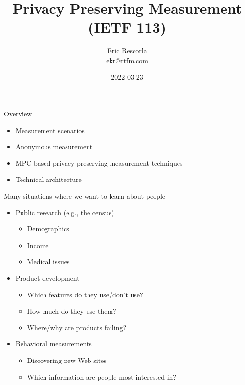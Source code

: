\documentclass[helvetica]{beamer}
\title{Privacy Preserving Measurement (IETF 113)}
\author{Eric Rescorla \\\url{ekr@rtfm.com}}
\date{2022-03-23}
\begin{document}
\begin{frame}
  \titlepage
\end{frame}

\begin{frame}{Overview}
  \begin{itemize}
  \item Measurement scenarios
  \item Anonymous measurement
  \item MPC-based privacy-preserving measurement techniques
  \item Technical architecture
  \end{itemize}
\end{frame}

  
\begin{frame}{Many situations where we want to learn about people}

  \begin{itemize}
  \item Public research (e.g., the census)
    \begin{itemize}
    \item Demographics
    \item Income
    \item Medical issues
    \end{itemize}
    
  \item Product development
    \begin{itemize}
    \item Which features do they use/don't use?
    \item How much do they use them?
    \item Where/why are products failing?      
    \end{itemize}
    
  \item Behavioral measurements
    \begin{itemize}
    \item Discovering new Web sites
    \item Which information are people most interested in?
    \end{itemize}
  \end{itemize}
\end{frame}
\end{document}
